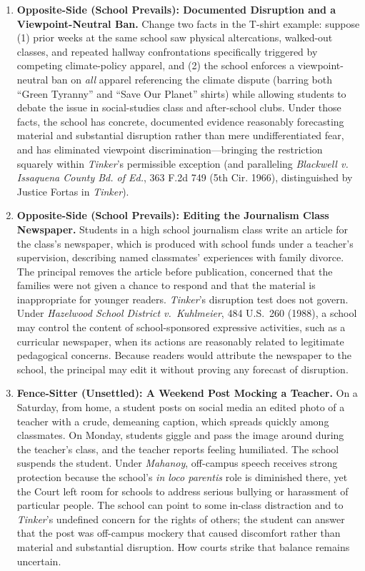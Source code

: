 \documentclass[12pt]{article}
\begin{document}
\begin{enumerate}
\item \textbf{Opposite-Side (School Prevails): Documented Disruption and a Viewpoint-Neutral Ban.} Change two facts in the T-shirt example: suppose (1) prior weeks at the same school saw physical altercations, walked-out classes, and repeated hallway confrontations specifically triggered by competing climate-policy apparel, and (2) the school enforces a viewpoint-neutral ban on \textit{all} apparel referencing the climate dispute (barring both ``Green Tyranny'' and ``Save Our Planet'' shirts) while allowing students to debate the issue in social-studies class and after-school clubs. Under those facts, the school has concrete, documented evidence reasonably forecasting material and substantial disruption rather than mere undifferentiated fear, and has eliminated viewpoint discrimination---bringing the restriction squarely within \textit{Tinker}'s permissible exception (and paralleling \textit{Blackwell v. Issaquena County Bd. of Ed.}, 363 F.2d 749 (5th Cir. 1966), distinguished by Justice Fortas in \textit{Tinker}).

\item \textbf{Opposite-Side (School Prevails): Editing the Journalism Class Newspaper.} Students in a high school journalism class write an article for the class's newspaper, which is produced with school funds under a teacher's supervision, describing named classmates' experiences with family divorce. The principal removes the article before publication, concerned that the families were not given a chance to respond and that the material is inappropriate for younger readers. \textit{Tinker}'s disruption test does not govern. Under \textit{Hazelwood School District v.\ Kuhlmeier}, 484 U.S.\ 260 (1988), a school may control the content of school-sponsored expressive activities, such as a curricular newspaper, when its actions are reasonably related to legitimate pedagogical concerns. Because readers would attribute the newspaper to the school, the principal may edit it without proving any forecast of disruption.

\item \textbf{Fence-Sitter (Unsettled): A Weekend Post Mocking a Teacher.} On a Saturday, from home, a student posts on social media an edited photo of a teacher with a crude, demeaning caption, which spreads quickly among classmates. On Monday, students giggle and pass the image around during the teacher's class, and the teacher reports feeling humiliated. The school suspends the student. Under \textit{Mahanoy}, off-campus speech receives strong protection because the school's \textit{in loco parentis} role is diminished there, yet the Court left room for schools to address serious bullying or harassment of particular people. The school can point to some in-class distraction and to \textit{Tinker}'s undefined concern for the rights of others; the student can answer that the post was off-campus mockery that caused discomfort rather than material and substantial disruption. How courts strike that balance remains uncertain.

\end{enumerate}
\end{document}
